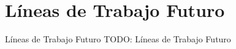\section{Líneas de Trabajo Futuro}

\begin{frame}{Líneas de Trabajo Futuro}
  TODO: Líneas de Trabajo Futuro
\end{frame}
